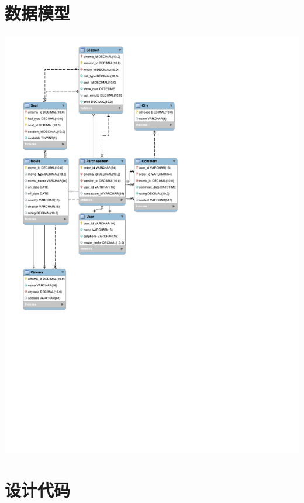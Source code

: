 \documentclass[a4paper]{article}
\begin{document}
  \section{数据模型}
%    
    \includegraphics{database_model.pdf}
  \section{设计代码}
  
\end{document}
